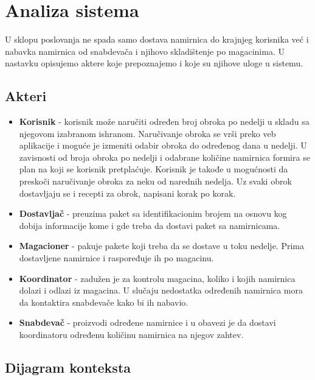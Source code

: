 
\section{Analiza sistema}

	U sklopu poslovanja ne spada samo dostava namirnica do krajnjeg korisnika već i nabavka namirnica od snabdevača i njihovo skladištenje po magacinima. U nastavku opisujemo aktere koje prepoznajemo i koje su njihove uloge u sistemu.
\subsection{Akteri}
	\begin{itemize}
		\item{\textbf{Korisnik}} - korisnik može naručiti određen broj obroka po nedelji u skladu sa njegovom izabranom ishranom. Naručivanje obroka se vrši preko veb aplikacije i moguće je izmeniti odabir obroka do određenog dana u nedelji. U zavisnosti od broja obroka po nedelji i odabrane količine namirnica formira se plan na koji se korisnik pretplaćuje. Korisnik je takođe u mogućnosti da preskoči naručivanje obroka za neku od narednih nedelja. Uz svaki obrok dostavljaju se i recepti za obrok, napisani korak po korak.
		\item{\textbf{Dostavljač}} - preuzima paket sa identifikacionim brojem na osnovu kog dobija informacije kome i gde treba da dostavi paket sa namirnicama.
		\item{\textbf{Magacioner}} - pakuje pakete koji treba da se dostave u toku nedelje. Prima dostavljene namirnice i raspoređuje ih po magacinu.
		\item{\textbf{Koordinator}} - zadužen je za kontrolu magacina, koliko i kojih namirnica dolazi i odlazi iz magacina. U slučaju nedostatka određenih namirnica mora da kontaktira snabdevače kako bi ih nabavio.
		\item{\textbf{Snabdevač}} - proizvodi određene namirnice i u obavezi je da dostavi koordinatoru određenu količinu namirnica na njegov zahtev.
	\end{itemize}
\subsection{Dijagram konteksta}
